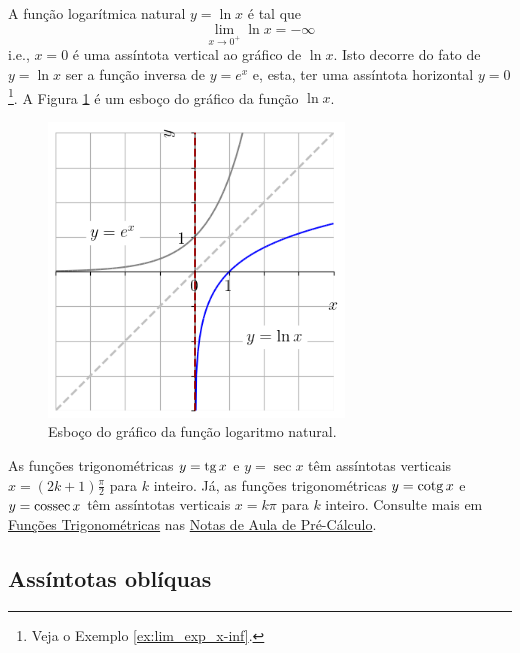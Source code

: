 \begin{ex}
  A função logarítmica natural $y = \ln x$ é tal que
  \begin{equation}
    \lim_{x\to 0^+} \ln x = -\infty
  \end{equation}
  i.e., $x=0$ é uma assíntota vertical ao gráfico de $\ln x$. Isto decorre do fato de $y = \ln x$ ser a função inversa de $y = e^x$ e, esta, ter uma assíntota horizontal $y=0$\footnote{Veja o Exemplo \ref{ex:lim_exp_x-inf}.}. A Figura \ref{fig:ex_lim_assvert_lnx} é um esboço do gráfico da função  $\ln x$.

    \begin{figure}[H]
      \centering
      \includegraphics[width=0.7\textwidth]{./cap_lim/dados/fig_ex_lim_assvert_lnx/fig}
      \caption{Esboço do gráfico da função logaritmo natural.}
      \label{fig:ex_lim_assvert_lnx}
    \end{figure}  
\end{ex}

\begin{ex}
  As funções trigonométricas $y = \operatorname{tg} x$ e $y = \sec x$ têm assíntotas verticais $x = (2k+1)\frac{\pi}{2}$ para $k$ inteiro. Já, as funções trigonométricas $y = \operatorname{cotg} x$ e $y = \operatorname{cossec} x$ têm assíntotas verticais $x = k\pi$ para $k$ inteiro. Consulte mais em \href{https://notaspedrok.com.br/notas/PreCalculo/cap_funcao_sec_funtri.html}{Funções Trigonométricas} nas \href{https://notaspedrok.com.br/notas/PreCalculo/main.html}{Notas de Aula de Pré-Cálculo}.
\end{ex}

\subsection{Assíntotas oblíquas}

